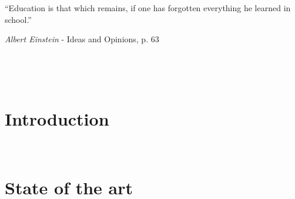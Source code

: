 

\usepackage[
    backend=bibtex, style=verbose, defernumbers=true, backref=true, block=none, hyperref=true
]{biblatex}

\setlength{}




\pagestyle{empty}
\newpage \ \newpage


\newpage \ \newpage

\renewcommand{\epigraphsize}{\large}
\renewcommand{\epigraphwidth}{10cm}
\vspace{3cm}
\epigraph{``Education is that which remains, if one has forgotten everything he learned in school.''}{\textit{Albert Einstein} - Ideas and Opinions, p. 63}
\newpage \ \newpage

%


\vspace{-1cm}
\setcounter{tocdepth}{3}
\tableofcontents
\newpage %
\listoffigures
\newpage %
{}
\renewcommand\lstlistlistingname{List of Sample codes/Examples}
\lstlistoflistings
\newpage \ \newpage %

\makeatletter
\@openrightfalse
\makeatother
\pagestyle{fancy}
\part{Introduction}
\label{part:introduction}


\newpage \thispagestyle{empty} \ \newpage
\part{State of the art}
\label{part:state-of-the-art}

\newpage \thispagestyle{empty} \ \newpage
